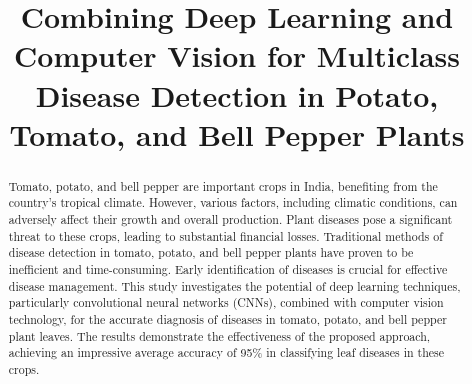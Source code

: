 \documentclass[conference]{IEEEtran}
\begin{document}
\title{Combining Deep Learning and Computer Vision for Multiclass Disease Detection in Potato, Tomato, and Bell Pepper Plants}

\author{
\and
{}
}


\maketitle

\begin{abstract}

Tomato, potato, and bell pepper are important crops in India, benefiting from the country's tropical climate. However, various factors, including climatic conditions, can adversely affect their growth and overall production. Plant diseases pose a significant threat to these crops, leading to substantial financial losses. Traditional methods of disease detection in tomato, potato, and bell pepper plants have proven to be inefficient and time-consuming. Early identification of diseases is crucial for effective disease management. This study investigates the potential of deep learning techniques, particularly convolutional neural networks (CNNs), combined with computer vision technology, for the accurate diagnosis of diseases in tomato, potato, and bell pepper plant leaves. The results demonstrate the effectiveness of the proposed approach, achieving an impressive average accuracy of 95\% in classifying leaf diseases in these crops. \\

 
\end{abstract}
\end{document}
